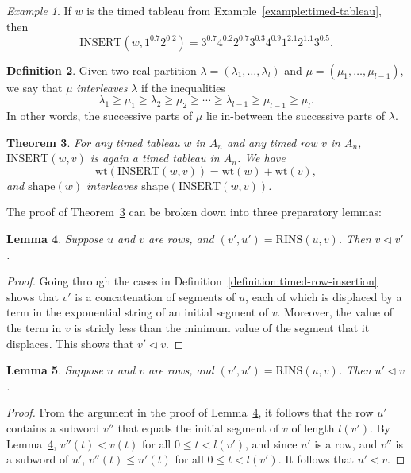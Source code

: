 \documentclass[10pt]{amsproc}
\newtheorem{theorem}{Theorem}[subsection]
\newtheorem{lemma}[theorem]{Lemma}
\theoremstyle{definition}
\newtheorem{definition}[theorem]{Definition}
\theoremstyle{remark}
\newtheorem{example}[theorem]{Example}
\newcommand{\rowins}{\mathrm{RINS}}
\newcommand{\ins}{\mathrm{INSERT}}
\newcommand{\wt}{\mathrm{wt}}
\newcommand{\shape}{\mathrm{shape}}
\begin{document}
\begin{example}
  If $w$ is the timed tableau from Example~\ref{example:timed-tableau}, then
  \begin{displaymath}
    \ins(w,1^{0.7}2^{0.2})=3^{0.7}4^{0.2}2^{0.7}3^{0.3}4^{0.9}1^{2.1}2^{1.1}3^{0.5}.
  \end{displaymath}
\end{example}
\begin{definition}
  Given two real partition $\lambda=(\lambda_1,\dotsc,\lambda_l)$ and $\mu=(\mu_1,\dotsc,\mu_{l-1})$, we say that $\mu$ \emph{interleaves} $\lambda$ if the inequalities
  \begin{displaymath}
    \lambda_1 \geq \mu_1 \geq \lambda_2 \geq \mu_2 \geq \dotsb \geq \lambda_{l-1}\geq \mu_{l-1}\geq \mu_l. 
  \end{displaymath}
  In other words, the successive parts of $\mu$ lie in-between the successive parts of $\lambda$.
\end{definition}
\begin{theorem}
  \label{theorem:tableauness-of-insertion}
  For any timed tableau $w$ in $A_n$ and any timed row $v$ in $A_n$, $\ins(w,v)$ is again a timed tableau in $A_n$.
  We have
  \begin{displaymath}
    \wt(\ins(w,v)) = \wt(w) + \wt(v),
  \end{displaymath}
  and $\shape(w)$ interleaves $\shape(\ins(w,v))$.
\end{theorem}
The proof of Theorem~\ref{theorem:tableauness-of-insertion} can be broken down into three preparatory lemmas:
\begin{lemma}
  \label{lemma:dom1.5}
  Suppose $u$ and $v$ are rows, and $(v',u')=\rowins(u,v)$.
  Then $v\lhd v'$.
\end{lemma}
\begin{proof}
  Going through the cases in Definition~\ref{definition:timed-row-insertion} shows that $v'$ is a concatenation of segments of $u$, each of which is displaced by a term in the exponential string of an initial segment of $v$.
  Moreover, the value of the term in $v$ is stricly less than the minimum value of the segment that it displaces.
  This shows that $v'\lhd v$.
\end{proof}
\begin{lemma}
  \label{lemma:dom1}
  Suppose $u$ and $v$ are rows, and $(v',u')=\rowins(u,v)$.
  Then $u'\lhd v$.
\end{lemma}
\begin{proof}
  From the argument in the proof of Lemma~\ref{lemma:dom1.5}, it follows that the row $u'$ contains a subword $v''$ that equals the initial segment of $v$ of length $l(v')$.
  By Lemma~\ref{lemma:dom1.5}, $v''(t)<v(t)$ for all $0\leq t<l(v')$, and since $u'$ is a row, and $v''$ is a subword of $u'$, $v''(t)\leq u'(t)$ for all $0\leq t<l(v')$.
  It follows that $u'\lhd v$.
\end{proof}
\end{document}
